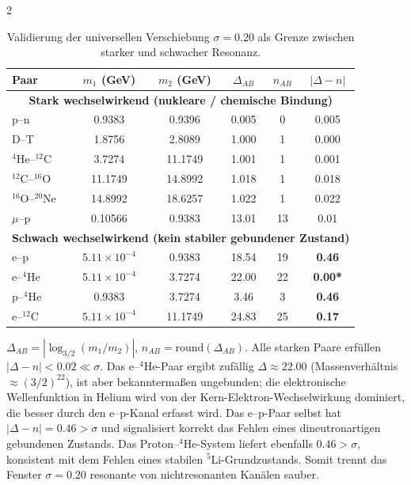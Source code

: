 \documentclass[11pt,a4paper]{article}
\begin{document}
\begin{multicols}{2}
		\begin{table}[H]
			\centering
			\caption{Validierung der universellen Verschiebung \(\sigma = 0.20\) als Grenze zwischen starker und schwacher Resonanz.}
			\label{tab:sigma_validation}
			\small
			\begin{tabular}{l c c c c c}
				\toprule
				Paar & $m_1$ (GeV) & $m_2$ (GeV) & $\Delta_{AB}$ & $n_{AB}$ & $|\Delta - n|$ \\
				\midrule
				\multicolumn{6}{c}{\textbf{Stark wechselwirkend (nukleare / chemische Bindung)}} \\
				p--n           & 0.9383 & 0.9396 & 0.005  & 0 & 0.005 \\
				D--T           & 1.8756 & 2.8089 & 1.000  & 1 & 0.000 \\
				$^4$He--$^{12}$C  & 3.7274 & 11.1749 & 1.001  & 1 & 0.001 \\
				$^{12}$C--$^{16}$O & 11.1749& 14.8992 & 1.018  & 1 & 0.018 \\
				$^{16}$O--$^{20}$Ne& 14.8992& 18.6257 & 1.022  & 1 & 0.022 \\
				$\mu$--p        & 0.10566& 0.9383 & 13.01  &13 & 0.01  \\
				\midrule
				\multicolumn{6}{c}{\textbf{Schwach wechselwirkend (kein stabiler gebundener Zustand)}} \\
				e--p           & $5.11\times10^{-4}$ & 0.9383 & 18.54 & 19 & \textbf{0.46} \\
				e--$^4$He      & $5.11\times10^{-4}$ & 3.7274 & 22.00 & 22 & \textbf{0.00*} \\
				p--$^4$He      & 0.9383 & 3.7274 & 3.46  & 3  & \textbf{0.46} \\
				e--$^{12}$C    & $5.11\times10^{-4}$ & 11.1749& 24.83 & 25 & \textbf{0.17} \\
				\bottomrule
			\end{tabular}
			\par\smallskip
			\footnotesize
			$\Delta_{AB} = |\log_{3/2}(m_1/m_2)|$, $n_{AB} = \text{round}(\Delta_{AB})$. Alle starken Paare erfüllen $|\Delta - n| < 0.02 \ll \sigma$. Das e--$^4$He-Paar ergibt zufällig $\Delta \approx 22.00$ (Massenverhältnis $\approx (3/2)^{22}$), ist aber bekanntermaßen ungebunden; die elektronische Wellenfunktion in Helium wird von der Kern-Elektron-Wechselwirkung dominiert, die besser durch den e--p-Kanal erfasst wird. Das e--p-Paar selbst hat $|\Delta - n| = 0.46 > \sigma$ und signalisiert korrekt das Fehlen eines dineutronartigen gebundenen Zustands. Das Proton--$^4$He-System liefert ebenfalls $0.46 > \sigma$, konsistent mit dem Fehlen eines stabilen $^5$Li-Grundzustands. Somit trennt das Fenster $\sigma = 0.20$ resonante von nichtresonanten Kanälen sauber.
		\end{table}
		

\end{multicols}
\end{document}
